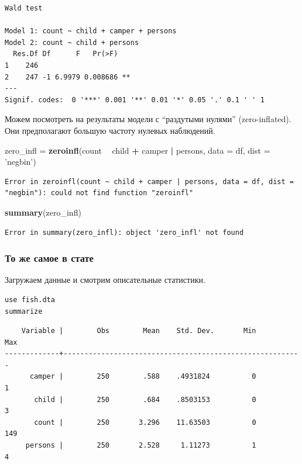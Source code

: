 \documentclass[]{book}
\newenvironment{Shaded}{\begin{snugshade}}{\end{snugshade}}
\newcommand{\DataTypeTok}[1]{\textcolor[rgb]{0.13,0.29,0.53}{#1}}
\newcommand{\KeywordTok}[1]{\textcolor[rgb]{0.13,0.29,0.53}{\textbf{#1}}}
\newcommand{\NormalTok}[1]{#1}
\newcommand{\OperatorTok}[1]{\textcolor[rgb]{0.81,0.36,0.00}{\textbf{#1}}}
\newcommand{\StringTok}[1]{\textcolor[rgb]{0.31,0.60,0.02}{#1}}
\begin{document}
\begin{verbatim}
Wald test

Model 1: count ~ child + camper + persons
Model 2: count ~ child + persons
  Res.Df Df      F   Pr(>F)   
1    246                      
2    247 -1 6.9979 0.008686 **
---
Signif. codes:  0 '***' 0.001 '**' 0.01 '*' 0.05 '.' 0.1 ' ' 1
\end{verbatim}

Можем посмотреть на результаты модели с ``раздутыми нулями'' (zero-inflated). Они предполагают большую частоту нулевых наблюдений.

\begin{Shaded}
\begin{Highlighting}[]
\NormalTok{zero_infl =}\StringTok{ }\KeywordTok{zeroinfl}\NormalTok{(count }\OperatorTok{~}\StringTok{ }\NormalTok{child }\OperatorTok{+}\StringTok{ }\NormalTok{camper }\OperatorTok{|}\StringTok{ }\NormalTok{persons, }\DataTypeTok{data =}\NormalTok{ df, }\DataTypeTok{dist =} \StringTok{'negbin'}\NormalTok{)}
\end{Highlighting}
\end{Shaded}

\begin{verbatim}
Error in zeroinfl(count ~ child + camper | persons, data = df, dist = "negbin"): could not find function "zeroinfl"
\end{verbatim}

\begin{Shaded}
\begin{Highlighting}[]
\KeywordTok{summary}\NormalTok{(zero_infl)}
\end{Highlighting}
\end{Shaded}

\begin{verbatim}
Error in summary(zero_infl): object 'zero_infl' not found
\end{verbatim}

\hypertarget{-----1}{%
\subsubsection{То же самое в стате}\label{-----1}}

Загружаем данные и смотрим описательные статистики.

\begin{verbatim}
use fish.dta
summarize
\end{verbatim}

\begin{verbatim}
    Variable |        Obs        Mean    Std. Dev.       Min        Max
-------------+---------------------------------------------------------
      camper |        250        .588    .4931824          0          1
       child |        250        .684    .8503153          0          3
       count |        250       3.296    11.63503          0        149
     persons |        250       2.528     1.11273          1          4
\end{verbatim}
\end{document}
